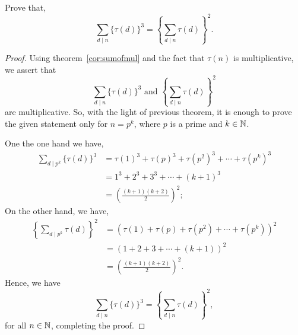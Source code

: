 \begin{pb}
    Prove that, \[\sum_{d \mid n} \{\tau(d)\}^3 = \left\{\sum_{d \mid n} \tau(d)\right\}^2.\]
\end{pb}
\begin{proof}
    Using theorem~\ref{cor:sumofmul} and the fact that $\tau(n)$ is multiplicative, we assert that \[\sum_{d \mid n} \{\tau(d)\}^3 \text{ and } \left\{\sum_{d \mid n} \tau(d)\right\}^2\] are multiplicative. So, with the light of previous theorem, it is enough to prove the given statement only for $n = p^k$, where $p$ is a prime and $k \in \mathbb{N}$.

    One the one hand we have,
    \begin{align*}
        \sum_{d \mid p^k} \{\tau(d)\}^3 &= {\tau(1)}^3 + {\tau(p)}^3 + {\tau(p^2)}^3 + \cdots + {\tau(p^k)}^3\\
        &= 1^3 + 2^3 + 3^3 + \cdots + (k+1)^3\\
        &= \left(\frac{(k+1)(k+2)}{2}\right)^2;
    \end{align*}
    On the other hand, we have,
    \begin{align*}
        \left\{\sum_{d \mid p^k} \tau(d)\right\}^2 &= \left(\tau(1) + \tau(p) + \tau(p^2) + \cdots + \tau(p^k)\right)^2\\
        &= \left(1 + 2 + 3 + \cdots + (k+1)\right)^2\\
        &= \left(\frac{(k+1)(k+2)}{2}\right)^2.
    \end{align*}
    Hence, we have \[\sum_{d \mid n} \{\tau(d)\}^3 = \left\{\sum_{d \mid n} \tau(d)\right\}^2,\] for all $n \in \mathbb{N}$, completing the proof.
\end{proof}

